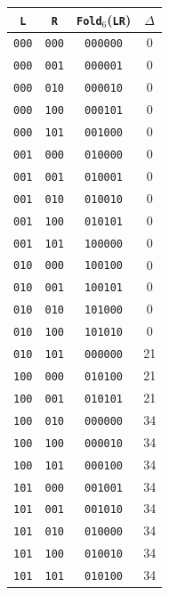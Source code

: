 \begin{tabular}{cccc}%
\hline%
\texttt{L}&\texttt{R}&\texttt{Fold}\(_6\)(\texttt{LR})&$\Delta$\\%
\hline%
\texttt{000}&\texttt{000}&\texttt{000000}&0\\%
\texttt{000}&\texttt{001}&\texttt{000001}&0\\%
\texttt{000}&\texttt{010}&\texttt{000010}&0\\%
\texttt{000}&\texttt{100}&\texttt{000101}&0\\%
\texttt{000}&\texttt{101}&\texttt{001000}&0\\%
\texttt{001}&\texttt{000}&\texttt{010000}&0\\%
\texttt{001}&\texttt{001}&\texttt{010001}&0\\%
\texttt{001}&\texttt{010}&\texttt{010010}&0\\%
\texttt{001}&\texttt{100}&\texttt{010101}&0\\%
\texttt{001}&\texttt{101}&\texttt{100000}&0\\%
\texttt{010}&\texttt{000}&\texttt{100100}&0\\%
\texttt{010}&\texttt{001}&\texttt{100101}&0\\%
\texttt{010}&\texttt{010}&\texttt{101000}&0\\%
\texttt{010}&\texttt{100}&\texttt{101010}&0\\%
\texttt{010}&\texttt{101}&\texttt{000000}&21\\%
\texttt{100}&\texttt{000}&\texttt{010100}&21\\%
\texttt{100}&\texttt{001}&\texttt{010101}&21\\%
\texttt{100}&\texttt{010}&\texttt{000000}&34\\%
\texttt{100}&\texttt{100}&\texttt{000010}&34\\%
\texttt{100}&\texttt{101}&\texttt{000100}&34\\%
\texttt{101}&\texttt{000}&\texttt{001001}&34\\%
\texttt{101}&\texttt{001}&\texttt{001010}&34\\%
\texttt{101}&\texttt{010}&\texttt{010000}&34\\%
\texttt{101}&\texttt{100}&\texttt{010010}&34\\%
\texttt{101}&\texttt{101}&\texttt{010100}&34\\%
\hline%
\end{tabular}
